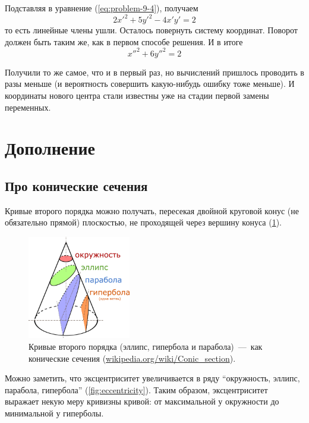 \documentclass[a4paper,12pt]{article}
\begin{document}
\begin{solution}
    Подставляя в уравнение (\ref{eq:problem-9-4}), получаем
    \[
      2x'^2 + 5y'^2 - 4x'y' = 2
    \]
    то есть линейные члены ушли.
    Осталось повернуть систему координат.
    Поворот должен быть таким же, как в первом способе решения.
    И в итоге
    \[
      x''^2 + 6y''^2 = 2
    \]
    
    Получили то же самое, что и в первый раз, но вычислений пришлось проводить в разы меньше (и вероятность совершить какую-нибудь ошибку тоже меньше).
    И координаты нового центра стали известны уже на стадии первой замены переменных.
  \end{solution}
  
  \newpage
  
  
  \section{Дополнение}
  
  \subsection{Про конические сечения}
  
  Кривые второго порядка можно получать, пересекая двойной круговой конус (не обязательно прямой) плоскостью, не проходящей через вершину конуса (\ref{fig:conic_sections}).
  
  \begin{figure}[h]
    \centering
    
    \includegraphics[width=0.4\textwidth]{conic_sections}
    
    \caption{Кривые второго порядка (эллипс, гипербола и парабола)~---~как конические сечения (\href{https://en.wikipedia.org/wiki/Conic_section}{wikipedia.org/wiki/Conic\_section}).}
    \label{fig:conic_sections}
  \end{figure}
  
  Можно заметить, что эксцентриситет увеличивается в ряду ``окружность, эллипс, парабола, гипербола'' (\ref{fig:eccentricity}).
  Таким образом, эксцентриситет выражает некую меру кривизны кривой: от максимальной у окружности до минимальной у гиперболы.
\end{document}
